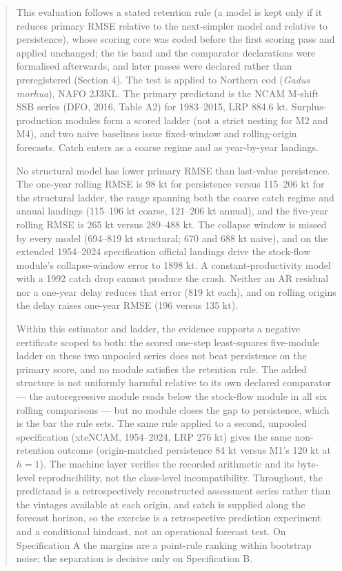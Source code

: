 \documentclass[11pt]{article}
\begin{document}
\begin{abstract}


This evaluation follows a stated retention rule (a model is kept only if
it reduces primary RMSE relative to the next-simpler model and relative
to persistence), whose scoring core was coded before the first scoring
pass and applied unchanged; the tie band and the comparator declarations
were formalised afterwards, and later passes were declared rather than
preregistered (Section 4).
The test is applied to Northern cod (\emph{Gadus morhua}), NAFO 2J3KL.
The primary predictand is the NCAM M-shift SSB series (DFO, 2016, Table
A2) for 1983--2015, LRP 884.6 kt. Surplus-production modules form a
scored ladder (not a strict nesting for M2 and M4), and two naive
baselines issue fixed-window and rolling-origin forecasts. Catch enters
as a coarse regime and as year-by-year landings.

No structural model has lower primary RMSE than last-value persistence.
The one-year rolling RMSE is 98 kt for persistence versus 115--206 kt
for the structural ladder, the range spanning both the coarse catch
regime and annual landings (115--196 kt coarse, 121--206 kt annual), and
the five-year rolling RMSE is 265 kt versus 289--488 kt. The collapse window
is missed by every model (694--819 kt structural; 670 and 688 kt naive),
and on the extended 1954--2024 specification official landings drive the
stock-flow module's collapse-window error to 1898 kt. A
constant-productivity model with a 1992 catch drop cannot produce the
crash. Neither an AR residual nor a one-year delay reduces that error
(819 kt each), and on rolling origins the delay raises one-year RMSE
(196 versus 135 kt).

Within this estimator and ladder, the evidence supports a negative
certificate scoped to both: the scored one-step least-squares
five-module ladder on these two unpooled series does not beat
persistence on the primary score, and no module satisfies the retention
rule. The added structure is not uniformly harmful relative to its own
declared comparator --- the autoregressive module reads below the
stock-flow module in all six rolling comparisons --- but no module
closes the gap to persistence, which is the bar the rule sets. The same rule applied to a second, unpooled specification
(xteNCAM, 1954--2024, LRP 276 kt) gives the same non-retention outcome
(origin-matched persistence 84 kt versus M1's 120 kt at \(h=1\)). The
machine layer verifies the recorded arithmetic and its byte-level
reproducibility, not the class-level incompatibility. Throughout, the
predictand is a retrospectively reconstructed assessment series rather
than the vintages available at each origin, and catch is supplied along
the forecast horizon, so the exercise is a retrospective prediction
experiment and a conditional hindcast, not an operational forecast test.
On Specification A the margins are a point-rule ranking within
bootstrap noise; the separation is decisive only on Specification B.

\end{abstract}
\end{document}
